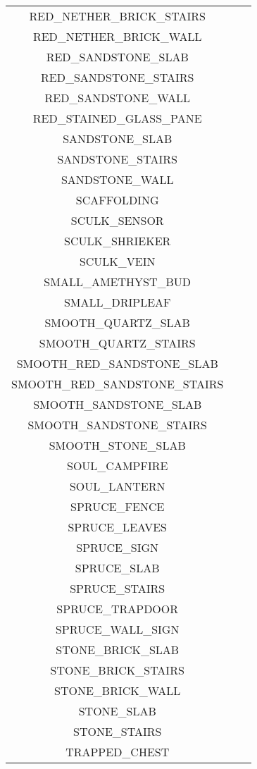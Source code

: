 \documentclass[11pt]{article}
\newcommand{\xmark}{\ding{55}}%
\begin{document}
\begin{longtable}{ |c|c|c| }
	RED\_NETHER\_BRICK\_STAIRS & \xmark \\
	RED\_NETHER\_BRICK\_WALL & \xmark \\
	RED\_SANDSTONE\_SLAB & \xmark \\
	RED\_SANDSTONE\_STAIRS & \xmark \\
	RED\_SANDSTONE\_WALL & \xmark \\
	RED\_STAINED\_GLASS\_PANE & \xmark \\
	SANDSTONE\_SLAB & \xmark \\
	SANDSTONE\_STAIRS & \xmark \\
	SANDSTONE\_WALL & \xmark \\
	SCAFFOLDING & \xmark \\
	SCULK\_SENSOR & \xmark \\
	SCULK\_SHRIEKER & \xmark \\
	SCULK\_VEIN & \xmark \\
	SMALL\_AMETHYST\_BUD & \xmark \\
	SMALL\_DRIPLEAF & \xmark \\
	SMOOTH\_QUARTZ\_SLAB & \xmark \\
	SMOOTH\_QUARTZ\_STAIRS & \xmark \\
	SMOOTH\_RED\_SANDSTONE\_SLAB & \xmark \\
	SMOOTH\_RED\_SANDSTONE\_STAIRS & \xmark \\
	SMOOTH\_SANDSTONE\_SLAB & \xmark \\
	SMOOTH\_SANDSTONE\_STAIRS & \xmark \\
	SMOOTH\_STONE\_SLAB & \xmark \\
	SOUL\_CAMPFIRE & \xmark \\
	SOUL\_LANTERN & \xmark \\
	SPRUCE\_FENCE & \xmark \\
	SPRUCE\_LEAVES & \xmark \\
	SPRUCE\_SIGN & \xmark \\
	SPRUCE\_SLAB & \xmark \\
	SPRUCE\_STAIRS & \xmark \\
	SPRUCE\_TRAPDOOR & \xmark \\
	SPRUCE\_WALL\_SIGN & \xmark \\
	STONE\_BRICK\_SLAB & \xmark \\
	STONE\_BRICK\_STAIRS & \xmark \\
	STONE\_BRICK\_WALL & \xmark \\
	STONE\_SLAB & \xmark \\
	STONE\_STAIRS & \xmark \\
	TRAPPED\_CHEST & \xmark \\

\end{longtable}
\end{document}
